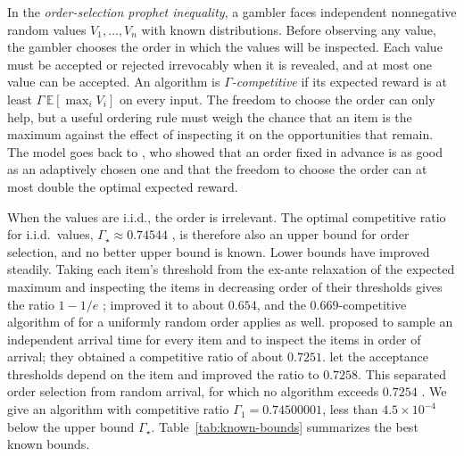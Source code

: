 \documentclass[11pt]{article}
\theoremstyle{definition}
\theoremstyle{remark}
\newcommand{\E}{\mathbb E}
\begin{document}
In the \emph{order-selection prophet inequality}, a gambler faces independent nonnegative
random values $V_1,\ldots,V_n$ with known distributions. Before observing any value, the
gambler chooses the order in which the values will be inspected. Each value must be accepted
or rejected irrevocably when it is revealed, and at most one value can be accepted. An
algorithm is \emph{$\Gamma$-competitive} if its expected reward is at least
$\Gamma\,\E[\max_iV_i]$ on every input. The freedom to choose the order can only help, but a
useful ordering rule must weigh the chance that an item is the maximum against the effect of
inspecting it on the opportunities that remain. The model goes back to \citet{Hill83}, who
showed that an order fixed in advance is as good as an adaptively chosen one and that the
freedom to choose the order can at most double the optimal expected reward.

When the values are i.i.d., the order is irrelevant. The optimal competitive ratio for
i.i.d.\ values, $\Gamma_\star\approx0.74544$ \citep{HK82,Kertz86,CFHOV21}, is therefore also
an upper bound for order selection, and no better upper bound is known. Lower bounds have
improved steadily. Taking each item's threshold from the ex-ante relaxation of the expected
maximum and inspecting the items in decreasing order of their thresholds gives the ratio
$1-1/e$ \citep{CHMS10,Yan11}; \citet{BGLPS21} improved it to about $0.654$, and the
$0.669$-competitive algorithm of \citet{CSZ21} for a uniformly random order applies as well. \citet{PT} proposed to sample an
independent arrival time for every item and to inspect the items in order of arrival; they
obtained a competitive ratio of about $0.7251$. \citet{BC} let the acceptance thresholds
depend on the item and improved the ratio to $0.7258$. This separated order selection from
random arrival, for which no algorithm exceeds $0.7254$ \citep{BC}. We give an algorithm with
competitive ratio $\Gamma_1=0.74500001$, less than $4.5\times10^{-4}$ below the upper bound
$\Gamma_\star$. Table~\ref{tab:known-bounds} summarizes the best known bounds.
\end{document}
